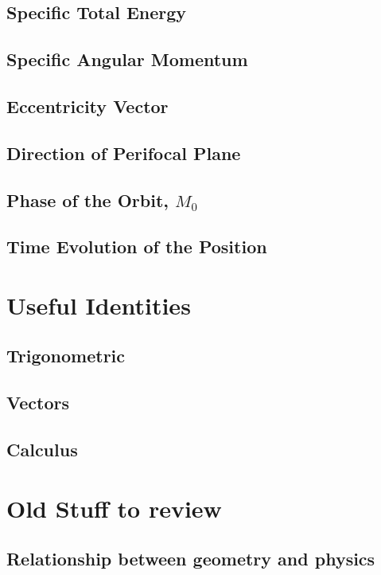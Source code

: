 \documentclass[a5paper,12pt]{book}
\begin{document}
\section{Specific Total Energy}
\section{Specific Angular Momentum}
\section{Eccentricity Vector}
\section{Direction of Perifocal Plane}
\section{Phase of the Orbit, $M_0$}
\section{Time Evolution of the Position}
\clearpage

\appendix

\chapter{Useful Identities}
\section{Trigonometric}

\section{Vectors}

\section{Calculus}



\chapter{Old Stuff to review}

\section{Relationship between geometry and physics}

\clearpage
\end{document}
